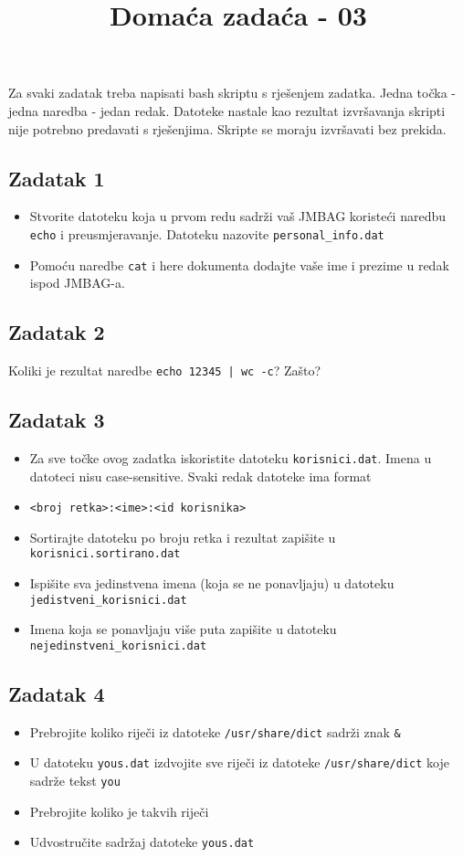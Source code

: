 \documentclass[12pt,a4paper]{article}
\newcommand{\shell}[1]{\texttt{#1}}
\begin{document}
  \title{Domaća zadaća - 03\vspace{-2em}}
  \maketitle
  Za svaki zadatak treba napisati bash skriptu s rješenjem zadatka. Jedna točka - jedna naredba - jedan redak. Datoteke nastale kao rezultat izvršavanja skripti nije potrebno predavati s rješenjima. Skripte se moraju izvršavati bez prekida.
  \subsection*{Zadatak 1}
  \begin{itemize}
    \item Stvorite datoteku koja u prvom redu sadrži vaš JMBAG koristeći naredbu \texttt{echo} i preusmjeravanje. Datoteku nazovite \texttt{personal\_info.dat}
    \item Pomoću naredbe \texttt{cat} i here dokumenta dodajte vaše ime i prezime u redak ispod JMBAG-a.
  \end{itemize}
  \subsection*{Zadatak 2}
  Koliki je rezultat naredbe \shell{echo 12345 | wc -c}? Zašto?
  \subsection*{Zadatak 3}
  \begin{itemize}
    \item[] Za sve točke ovog zadatka iskoristite datoteku \texttt{korisnici.dat}. Imena u datoteci nisu case-sensitive. Svaki redak datoteke ima format
    \item[] \texttt{<broj retka>:<ime>:<id korisnika>}
    \item Sortirajte datoteku po broju retka i rezultat zapišite u \texttt{korisnici.sortirano.dat}
    \item Ispišite sva jedinstvena imena (koja se ne ponavljaju) u datoteku\\\texttt{jedistveni\_korisnici.dat}
    \item Imena koja se ponavljaju više puta zapišite u datoteku\\\texttt{nejedinstveni\_korisnici.dat}
  \end{itemize}
  \subsection*{Zadatak 4}
  \begin{itemize}
  	\item Prebrojite koliko riječi iz datoteke \texttt{/usr/share/dict} sadrži znak \texttt{\&}
  	\item U datoteku \texttt{yous.dat} izdvojite sve riječi iz datoteke \texttt{/usr/share/dict} koje sadrže tekst \texttt{you}
  	\item Prebrojite koliko je takvih riječi
  	\item Udvostručite sadržaj datoteke \texttt{yous.dat}
  \end{itemize}
\end{document}
